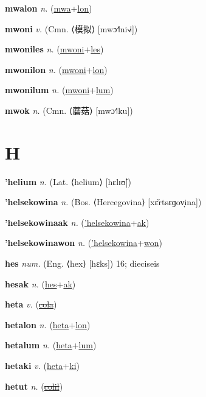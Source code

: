 \textbf{\hypertarget{mwalon}{mwalon}} \textit{n.} (\hyperlink{mwa}{mwa}+\allowbreak \hyperlink{lon}{lon})


\textbf{\hypertarget{mwoni}{mwoni}} \textit{v.} (Cmn. ⟨{\chinese{}模拟}⟩ [mwɔ˧˥ni˧˩˧])


\textbf{\hypertarget{mwoniles}{mwoniles}} \textit{n.} (\hyperlink{mwoni}{mwoni}+\allowbreak \hyperlink{les}{les})


\textbf{\hypertarget{mwonilon}{mwonilon}} \textit{n.} (\hyperlink{mwoni}{mwoni}+\allowbreak \hyperlink{lon}{lon})


\textbf{\hypertarget{mwonilum}{mwonilum}} \textit{n.} (\hyperlink{mwoni}{mwoni}+\allowbreak \hyperlink{lum}{lum})


\textbf{\hypertarget{mwok}{mwok}} \textit{n.} (Cmn. ⟨{\chinese{}蘑菇}⟩ [mwɔ˧˥ku])


\section{H}

\textbf{\hypertarget{'helium}{'helium}} \textit{n.} (Lat. ⟨helium⟩ [hɛlɪʊ̃])


\textbf{\hypertarget{'helsekowina}{'helsekowina}} \textit{n.} (Bos. ⟨Hercegovina⟩ [xɛ̌rtsɛɡov̞ina])


\textbf{\hypertarget{'helsekowinaak}{'helsekowinaak}} \textit{n.} (\hyperlink{'helsekowina}{'helsekowina}+\allowbreak \hyperlink{ak}{ak})


\textbf{\hypertarget{'helsekowinawon}{'helsekowinawon}} \textit{n.} (\hyperlink{'helsekowina}{'helsekowina}+\allowbreak \hyperlink{won}{won})


\textbf{\hypertarget{hes}{hes}} \textit{num.} (Eng. ⟨hex⟩ [hɛks])
16; dieciseis

\textbf{\hypertarget{hesak}{hesak}} \textit{n.} (\hyperlink{hes}{hes}+\allowbreak \hyperlink{ak}{ak})


\textbf{\hypertarget{heta}{heta}} \textit{v.} (\hyperlink{cola}{\sout{cola}})


\textbf{\hypertarget{hetalon}{hetalon}} \textit{n.} (\hyperlink{heta}{heta}+\allowbreak \hyperlink{lon}{lon})


\textbf{\hypertarget{hetalum}{hetalum}} \textit{n.} (\hyperlink{heta}{heta}+\allowbreak \hyperlink{lum}{lum})


\textbf{\hypertarget{hetaki}{hetaki}} \textit{v.} (\hyperlink{heta}{heta}+\allowbreak \hyperlink{ki}{ki})


\textbf{\hypertarget{hetut}{hetut}} \textit{n.} (\hyperlink{colil}{\sout{colil}})


